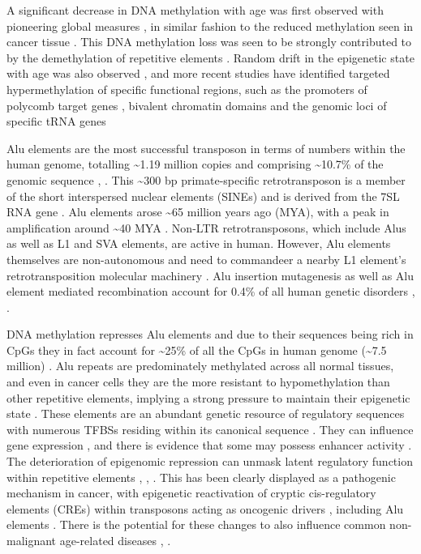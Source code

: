 \documentclass[]{book}
\begin{document}
A significant decrease in DNA methylation with age was first observed with pioneering global measures \citep{Wilson1983}, in similar fashion to the reduced methylation seen in cancer tissue \citep{Gama-Sosa1983}.
This DNA methylation loss was seen to be strongly contributed to by the demethylation of repetitive elements \citep{Bollati2010}.
Random drift in the epigenetic state with age was also observed \citep{Bollati2010}, and more recent studies have identified targeted hypermethylation of specific functional regions, such as the promoters of polycomb target genes \citep{Teschendorff2010}, bivalent chromatin domains \citep{Rakyan2010} and the genomic loci of specific tRNA genes \citep{Acton2020}

Alu elements are the most successful transposon in terms of numbers within the human genome, totalling \textasciitilde1.19 million copies and comprising \textasciitilde10.7\% of the genomic sequence \citep{Dewannieux2003}, \citep{Deininger2011}.
This \textasciitilde300 bp primate-specific retrotransposon is a member of the short interspersed nuclear elements (SINEs) and is derived from the 7SL RNA gene \citep{Ullu1984}.
Alu elements arose \textasciitilde65 million years ago (MYA), with a peak in amplification around \textasciitilde40 MYA \citep{Ade2013}.
Non-LTR retrotransposons, which include Alus as well as L1 and SVA elements, are active in human.
However, Alu elements themselves are non-autonomous and need to commandeer a nearby L1 element's retrotransposition molecular machinery \citep{Cordaux2009}.
Alu insertion mutagenesis as well as Alu element mediated recombination account for 0.4\% of all human genetic disorders \citep{Kazazian2017}, \citep{Belancio2008}.

DNA methylation represses Alu elements and due to their sequences being rich in CpGs they in fact account for \textasciitilde25\% of all the CpGs in human genome (\textasciitilde7.5 million) \citep{Deininger2011}.
Alu repeats are predominately methylated across all normal tissues, and even in cancer cells they are the more resistant to hypomethylation than other repetitive elements, implying a strong pressure to maintain their epigenetic state \citep{Jorda2017}.
These elements are an abundant genetic resource of regulatory sequences with
numerous TFBSs residing within its canonical sequence \citep{Polak2006}.
They can influence gene expression \citep{Chen2017b}, \citep{RobertoFerrari2019} and there is evidence that some may possess enhancer activity \citep{Su2014}.
The deterioration of epigenomic repression can unmask latent regulatory function within repetitive elements \citep{Ward2013}, \citep{Chuong2017}, \citep{Xie2013}.
This has been clearly displayed as a pathogenic mechanism in cancer, with epigenetic reactivation of cryptic cis-regulatory elements (CREs) within transposons acting as oncogenic drivers \citep{Jang2019} , including Alu elements \citep{Rajendiran2016}.
There is the potential for these changes to also influence common non-malignant age-related diseases \citep{Chuong2017}, \citep{Payer2017}.
\end{document}
